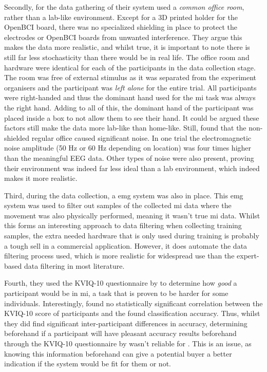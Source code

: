 Secondly, for the data gathering of their system \citet{cheap_bci_feasibility} used a \textit{common office room}, rather than a lab-like environment.
Except for a 3D printed holder for the OpenBCI board, there was no specialized shielding in place to protect the electrodes or OpenBCI boards from unwanted interference.
They argue this makes the data more realistic, and whilst true, it is important to note there is still far less stochasticity than there would be in real life.
The office room and hardware were identical for each of the participants in the data collection stage.
The room was free of external stimulus as it was separated from the experiment organisers and the participant was \textit{left alone} for the entire trial.
All participants were right-handed and thus the dominant hand used for the \gls{mi} task was always the right hand.
Adding to all of this, the dominant hand of the participant was placed inside a box to not allow them to see their hand.
It could be argued these factors still make the data more lab-like than home-like.
Still, \citet{cheap_bci_feasibility} found that the non-shielded regular office caused significant noise.
In one trial the electromagnetic noise amplitude (50 Hz or 60 Hz depending on location) was four times higher than the meaningful EEG data.
Other types of noise were also present, proving their environment was indeed far less ideal than a lab environment, which indeed makes it more realistic.

Third, during the data collection, a \gls{emg} system was also in place.
This \gls{emg} system was used to filter out samples of the collected \gls{mi} data where the movement was also physically performed, meaning it wasn't true \gls{mi} data.
Whilst this forms an interesting approach to data filtering when collecting training samples, the extra needed hardware that is only used during training is probably a tough sell in a commercial application.
However, it does automate the data filtering process used, which is more realistic for widespread use than the expert-based data filtering in most literature. 

Fourth, they used the KVIQ-10 questionnaire by \citet{kviq} to determine how \textit{good} a participant would be in \gls{mi}, a task that is proven to be harder for some individuals.
Interestingly, \citet{cheap_bci_feasibility} found no statistically significant correlation between the KVIQ-10 score of participants and the found classification accuracy.
Thus, whilst they did find significant inter-participant differences in accuracy, determining beforehand if a participant will have pleasant accuracy results beforehand through the KVIQ-10 questionnaire by \citet{kviq} wasn't reliable for \citet{cheap_bci_feasibility}.
This is an issue, as knowing this information beforehand can give a potential buyer a better indication if the system would be fit for them or not.

